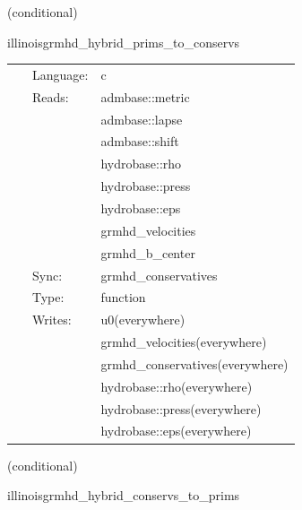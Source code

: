 \vspace{5mm}

   (conditional) 

\hspace{5mm} illinoisgrmhd\_hybrid\_prims\_to\_conservs 

\hspace{5mm}{\it hybrid version of illinoisgrmhd\_prims\_to\_conservs } 


\hspace{5mm}

 \begin{tabular*}{160mm}{cll} 
~ & Language:  & c \\ 
~ & Reads:  & admbase::metric \\ 
~& ~ &admbase::lapse\\ 
~& ~ &admbase::shift\\ 
~& ~ &hydrobase::rho\\ 
~& ~ &hydrobase::press\\ 
~& ~ &hydrobase::eps\\ 
~& ~ &grmhd\_velocities\\ 
~& ~ &grmhd\_b\_center\\ 
~ & Sync:  & grmhd\_conservatives \\ 
~ & Type:  & function \\ 
~ & Writes:  & u0(everywhere) \\ 
~& ~ &grmhd\_velocities(everywhere)\\ 
~& ~ &grmhd\_conservatives(everywhere)\\ 
~& ~ &hydrobase::rho(everywhere)\\ 
~& ~ &hydrobase::press(everywhere)\\ 
~& ~ &hydrobase::eps(everywhere)\\ 
\end{tabular*} 


\vspace{5mm}

   (conditional) 

\hspace{5mm} illinoisgrmhd\_hybrid\_conservs\_to\_prims 

\hspace{5mm}{\it hybrid version of illinoisgrmhd\_conservs\_to\_prims } 


\hspace{5mm}

